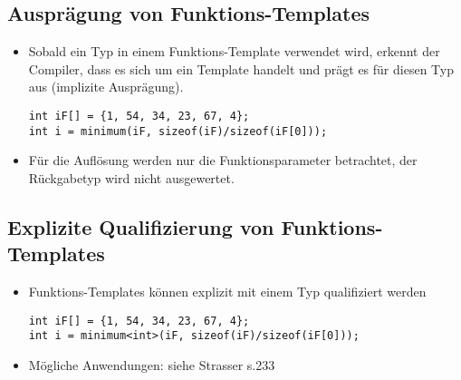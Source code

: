 \subsection{Ausprägung von Funktions-Templates}
\begin{itemize}
	\item Sobald ein Typ in einem Funktions-Template verwendet wird, erkennt der Compiler, dass es sich um ein Template handelt und prägt es für diesen Typ aus (implizite Ausprägung).
	\begin{minipage}{0.6\linewidth}
	\vspace{-\baselineskip}
\begin{lstlisting}
int iF[] = {1, 54, 34, 23, 67, 4};
int i = minimum(iF, sizeof(iF)/sizeof(iF[0]));
\end{lstlisting}
	\end{minipage}
	\item Für die Auflösung werden nur die Funktionsparameter betrachtet, der Rückgabetyp wird nicht ausgewertet.
\end{itemize}

\subsection{Explizite Qualifizierung von Funktions-Templates}
\begin{itemize}
	\item Funktions-Templates können explizit mit einem Typ qualifiziert werden
	\begin{minipage}{0.7\linewidth}
	\vspace{-\baselineskip}
\begin{lstlisting}
int iF[] = {1, 54, 34, 23, 67, 4};
int i = minimum<int>(iF, sizeof(iF)/sizeof(iF[0]));
\end{lstlisting}
	\end{minipage}
	\item Mögliche Anwendungen: siehe Strasser s.233
\end{itemize}

